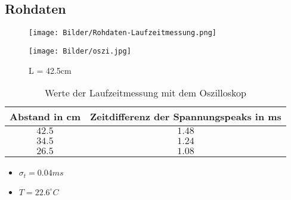 \documentclass[11pt]{beamer}
\begin{document}
\subsection{Rohdaten}
\begin{frame}
\begin{figure}[H]
\centering
\texttt{[image: Bilder/Rohdaten-Laufzeitmessung.png]}
\label{Laufzeitrohdaten}
\end{figure}
\end{frame}
\begin{frame}
\begin{figure}[H]
\centering
\texttt{[image: Bilder/oszi.jpg]}
\caption{L = 42.5cm}
\end{figure}
\end{frame}
\begin{frame}
\begin{table}[H]\centering
\caption{Werte der Laufzeitmessung mit dem Oszilloskop}
\begin{tabular}{c|c}
Abstand in cm & Zeitdifferenz der Spannungspeaks in ms\\ 
\hline
$42.5$& $1.48$\\ 
$34.5$& $1.24$\\
$26.5$& $1.08$\\
\end{tabular} 
\end{table}
\begin{itemize}
\item $\sigma_t=0.04ms$
\item $T=22.6^{\circ}C$
\end{itemize}
\end{frame}
\end{document}
